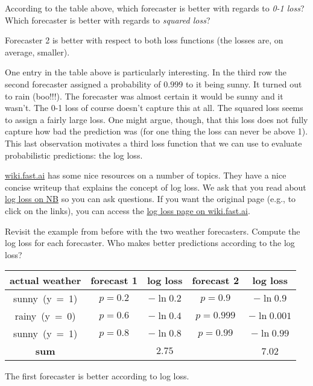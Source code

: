 \documentclass[assignment03_Solutions]{subfiles}
\begin{document}
\vspace{1em}

\begin{understandingcheck}
According to the table above, which forecaster is better with regards to \emph{0-1 loss}?  Which forecaster is better with regards to \emph{squared loss}?

\begin{boxedsolution}
Forecaster 2 is better with respect to both loss functions (the losses are, on average, smaller).
\end{boxedsolution}
\end{understandingcheck}

One entry in the table above is particularly interesting.  In the third row the second forecaster assigned a probability of $0.999$ to it being sunny.  It turned out to rain (boo!!!).  The forecaster was almost certain it would be sunny and it wasn't.  The 0-1 loss of course doesn't capture this at all.  The squared loss seems to assign a fairly large loss.  One might argue, though, that this loss does not fully capture how bad the prediction was (for one thing the loss can never be above 1).  This last observation motivates a third loss function that we can use to evaluate probabilistic predictions: the log loss.
\vspace{1em}
\begin{externalresources}[(30 minutes)]
\url{wiki.fast.ai} has some nice resources on a number of topics.  They have a nice concise writeup that explains the concept of log loss.  We ask that you read about \href{http://nb.mit.edu/f/55213}{log loss on NB} so you can ask questions.  If you want the original page (e.g., to click on the links), you can access the \href{http://wiki.fast.ai/index.php/Log_Loss}{log loss page on wiki.fast.ai}.
\begin{exercise}
Revisit the example from before with the two weather forecasters.  Compute the log loss for each forecaster.  Who makes better predictions according to the log loss?
\begin{boxedsolution}
\begin{center}
\small
\begin{tabular}{c | c | c | c | c }
\hline
actual weather & forecast 1 & log loss & forecast 2 & log loss \\
\hline
\mbox{sunny (y = 1)} & $p = 0.2$ & $-\ln 0.2$ & $p = 0.9$ &  $-\ln 0.9$\\
\mbox{rainy (y = 0)} & $p = 0.6$  &  $-\ln 0.4$ & $p = 0.999$ &  $-\ln 0.001$\\ 
\mbox{sunny (y = 1)} & $p = 0.8$ & $-\ln 0.8$ & $p = 0.99$ & $-\ln 0.99$\\
\hline
\textbf{sum} & & $2.75$ &  & 7.02
\end{tabular}
\end{center}
The first forecaster is better according to log loss.

\end{boxedsolution}

\end{exercise}
\end{externalresources}
\end{document}
